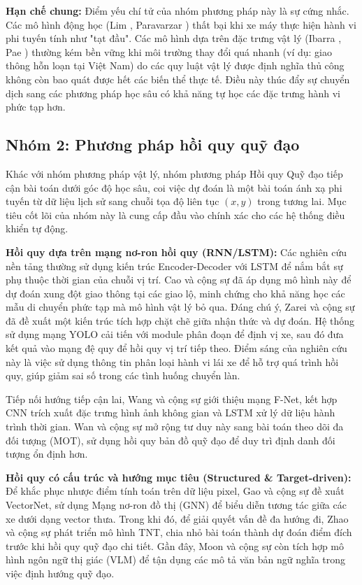 	\textbf{Hạn chế chung:}
	Điểm yếu chí tử của nhóm phương pháp này là sự cứng nhắc. Các mô hình động học (Lim \cite{Lim2018}, Paravarzar \cite{Paravarzar2020}) thất bại khi xe máy thực hiện hành vi phi tuyến tính như "tạt đầu". Các mô hình dựa trên đặc trưng vật lý (Ibarra \cite{Ibarra2016}, Pae \cite{Pae2018}) thường kém bền vững khi môi trường thay đổi quá nhanh (ví dụ: giao thông hỗn loạn tại Việt Nam) do các quy luật vật lý được định nghĩa thủ công không còn bao quát được hết các biến thể thực tế. Điều này thúc đẩy sự chuyển dịch sang các phương pháp học sâu có khả năng tự học các đặc trưng hành vi phức tạp hơn.
    
	\subsection{Nhóm 2: Phương pháp hồi quy quỹ đạo}

	Khác với nhóm phương pháp vật lý, nhóm phương pháp Hồi quy Quỹ đạo tiếp cận bài toán dưới góc độ học sâu, coi việc dự đoán là một bài toán ánh xạ phi tuyến từ dữ liệu lịch sử sang chuỗi tọa độ liên tục $(x, y)$ trong tương lai. Mục tiêu cốt lõi của nhóm này là cung cấp đầu vào chính xác cho các hệ thống điều khiển tự động.

	\textbf{Hồi quy dựa trên mạng nơ-ron hồi quy (RNN/LSTM):}
	Các nghiên cứu nền tảng thường sử dụng kiến trúc Encoder-Decoder với LSTM để nắm bắt sự phụ thuộc thời gian của chuỗi vị trí. Cao và cộng sự \cite{Cao2021} đã áp dụng mô hình này để dự đoán xung đột giao thông tại các giao lộ, minh chứng cho khả năng học các mẫu di chuyển phức tạp mà mô hình vật lý bỏ qua.
	Đáng chú ý, Zarei và cộng sự \cite{Zarei2023} đã đề xuất một kiến trúc tích hợp chặt chẽ giữa nhận thức và dự đoán. Hệ thống sử dụng mạng YOLO cải tiến với module phân đoạn để định vị xe, sau đó đưa kết quả vào mạng đệ quy để hồi quy vị trí tiếp theo. Điểm sáng của nghiên cứu này là việc sử dụng thông tin phân loại hành vi lái xe để hỗ trợ quá trình hồi quy, giúp giảm sai số trong các tình huống chuyển làn.

	Tiếp nối hướng tiếp cận lai, Wang và cộng sự \cite{Wang2021} giới thiệu mạng F-Net, kết hợp CNN trích xuất đặc trưng hình ảnh không gian và LSTM xử lý dữ liệu hành trình thời gian. Wan và cộng sự \cite{Wan2021} mở rộng tư duy này sang bài toán theo dõi đa đối tượng (MOT), sử dụng hồi quy bản đồ quỹ đạo để duy trì định danh đối tượng ổn định hơn.

	\textbf{Hồi quy có cấu trúc và hướng mục tiêu (Structured \& Target-driven):}
	Để khắc phục nhược điểm tính toán trên dữ liệu pixel, Gao và cộng sự \cite{VectorNet2020} đề xuất VectorNet, sử dụng Mạng nơ-ron đồ thị (GNN) để biểu diễn tương tác giữa các xe dưới dạng vector thưa. Trong khi đó, để giải quyết vấn đề đa hướng đi, Zhao và cộng sự \cite{TNT2020} phát triển mô hình TNT, chia nhỏ bài toán thành dự đoán điểm đích trước khi hồi quy quỹ đạo chi tiết. Gần đây, Moon và cộng sự \cite{VisionTrap2024} còn tích hợp mô hình ngôn ngữ thị giác (VLM) để tận dụng các mô tả văn bản ngữ nghĩa trong việc định hướng quỹ đạo.

